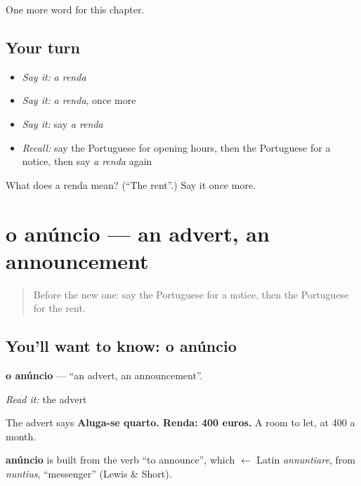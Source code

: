 \begin{grammarlens}[title={What you've built}]
One more word for this chapter.
\end{grammarlens}

\subsection*{Your turn}
\begin{itemize}
\raggedright
  \item \emph{Say it:} \emph{a renda}
  \item \emph{Say it:} \emph{a renda}, once more
  \item \emph{Say it:} say \emph{a renda}
  \item \emph{Recall:} say the Portuguese for opening hours, then the Portuguese for a notice, then say \emph{a renda} again
\end{itemize}

\begin{tcolorbox}[breakable,colback=teal!4,colframe=teal!35!black,title={Before you move on}]
What does a renda mean? (\textquotedblleft{}The rent\textquotedblright{}.) Say it once more.
\end{tcolorbox}
\section[o anúncio]{o anúncio — an advert, an announcement}

\label{lesson:PT-C137-o-anuncio}



\begin{quote}
Before the new one: say the Portuguese for a notice, then the Portuguese for the rent.
\end{quote}

\subsection*{You'll want to know: o anúncio}
\textbf{o anúncio} — \textquotedblleft{}an advert, an announcement\textquotedblright{}.

\emph{Read it:} the advert

The advert says \textbf{Aluga-se quarto. Renda: 400 euros.} A room to let, at 400 a month.

\begin{cousinweb}
\textbf{anúncio} is built from the verb \textquotedblleft{}to announce\textquotedblright{}, which $\leftarrow$ Latin \emph{annuntiare}, from \emph{nuntius}, \textquotedblleft{}messenger\textquotedblright{} (Lewis \& Short).
\end{cousinweb}

